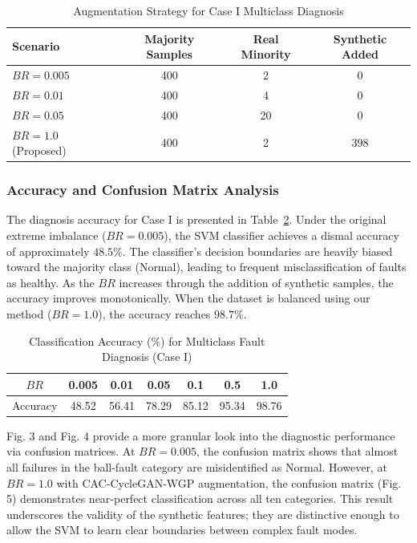 \begin{table}[htbp]
\centering
\caption{Augmentation Strategy for Case I Multiclass Diagnosis}
\label{tab:aug_case1}
\begin{tabular}{lccc}
\hline
\textbf{Scenario} & \textbf{Majority Samples} & \textbf{Real Minority} & \textbf{Synthetic Added} \\ \hline
$BR = 0.005$ & 400 & 2 & 0 \\
$BR = 0.01$  & 400 & 4 & 0 \\
$BR = 0.05$  & 400 & 20 & 0 \\
$BR = 1.0$ (Proposed) & 400 & 2 & 398 \\
\hline
\end{tabular}
\end{table}

\subsubsection{Accuracy and Confusion Matrix Analysis}
The diagnosis accuracy for Case I is presented in Table~\ref{tab:acc_case1}. Under the original extreme imbalance ($BR=0.005$), the SVM classifier achieves a dismal accuracy of approximately $48.5\%$. The classifier's decision boundaries are heavily biased toward the majority class (Normal), leading to frequent misclassification of faults as healthy. As the $BR$ increases through the addition of synthetic samples, the accuracy improves monotonically. When the dataset is balanced using our method ($BR=1.0$), the accuracy reaches $98.7\%$.

\begin{table}[htbp]
\centering
\caption{Classification Accuracy (\%) for Multiclass Fault Diagnosis (Case I)}
\label{tab:acc_case1}
\begin{tabular}{ccccccc}
\hline
$BR$ & 0.005 & 0.01 & 0.05 & 0.1 & 0.5 & 1.0 \\ \hline
Accuracy & 48.52 & 56.41 & 78.29 & 85.12 & 95.34 & 98.76 \\
\hline
\end{tabular}
\end{table}

Fig. 3 and Fig. 4 provide a more granular look into the diagnostic performance via confusion matrices. At $BR=0.005$, the confusion matrix shows that almost all failures in the ball-fault category are misidentified as Normal. However, at $BR=1.0$ with CAC-CycleGAN-WGP augmentation, the confusion matrix (Fig. 5) demonstrates near-perfect classification across all ten categories. This result underscores the validity of the synthetic features; they are distinctive enough to allow the SVM to learn clear boundaries between complex fault modes.

